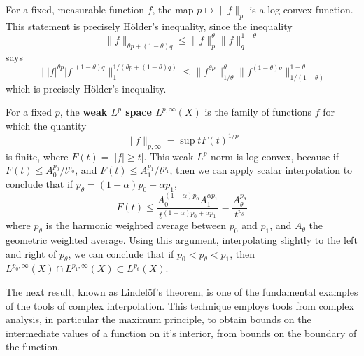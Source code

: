 \begin{example}
	For a fixed, measurable function $f$, the map $p \mapsto \| f \|_p$ is a log convex function. This statement is precisely H\"{o}lder's inequality, since the inequality
	\[ \| f \|_{\theta p + (1 - \theta) q} \leq \| f \|_p^\theta \| f \|_{q}^{1-\theta} \]
	says
	\[ \| |f|^{\theta p} |f|^{(1 - \theta) q} \|_1^{1/(\theta p + (1 - \theta) q)} \leq \| f^{\theta p} \|_{1/\theta}^{\theta} \| f^{(1-\theta)q} \|_{1/(1-\theta)}^{1-\theta} \]
	which is precisely H\"{o}lder's inequality.
\end{example}

\begin{example}
	For a fixed $p$, the {\bf weak $L^p$ space $L^{p,\infty}(X)$} is the family of functions $f$ for which the quantity
	\[ \| f \|_{p,\infty} = \sup t F(t)^{1/p} \]
	is finite, where $F(t) = ||f| \geq t|$. This weak $L^p$ norm is log convex, because if $F(t) \leq A_0^{p_0}/t^{p_0}$, and $F(t) \leq A_1^{p_1}/t^{p_1}$, then we can apply scalar interpolation to conclude that if $p_\theta = (1 - \alpha) p_0 + \alpha p_1$,
	\[ F(t) \leq \frac{A_0^{(1 - \alpha) p_0}A_1^{\alpha p_1}}{t^{(1 - \alpha)p_0 + \alpha p_1}} = \frac{A_\theta^{p_\theta}}{t^{p_\theta}} \]
	where $p_\theta$ is the harmonic weighted average between $p_0$ and $p_1$, and $A_\theta$ the geometric weighted average. Using this argument, interpolating slightly to the left and right of $p_\theta$, we can conclude that if $p_0 < p_\theta < p_1$, then $L^{p_0,\infty}(X) \cap L^{p_1,\infty}(X) \subset L^{p_\theta}(X)$.
\end{example}

The next result, known as Lindel\"{o}f's theorem, is one of the fundamental examples of the tools of complex interpolation. This technique employs tools from complex analysis, in particular the maximum principle, to obtain bounds on the intermediate values of a function on it's interior, from bounds on the boundary of the function.

